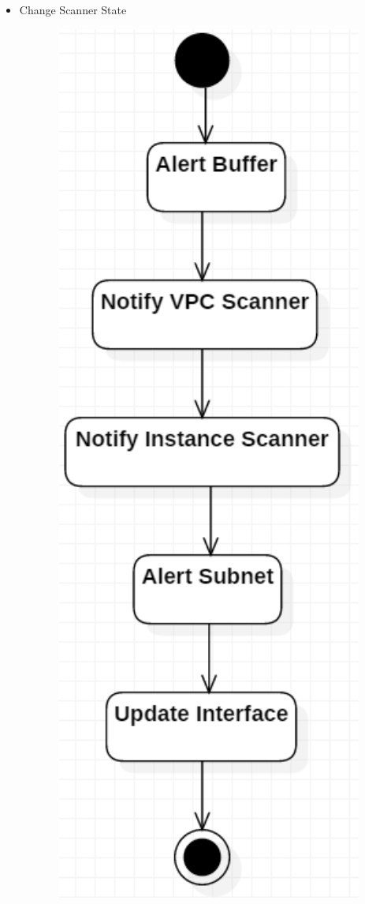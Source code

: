 \documentclass[a4paper,12pt]{report}
\begin{document}
\begin{itemize}
\begin{center}
		\end{center}
	\item Change Scanner State
		\begin{center}
	 	\includegraphics[width=1\textwidth] {./Diagrams/ChangeScannerStateSequence.png}\\[0.4cm]

\end{center}
\end{itemize}
\end{document}
